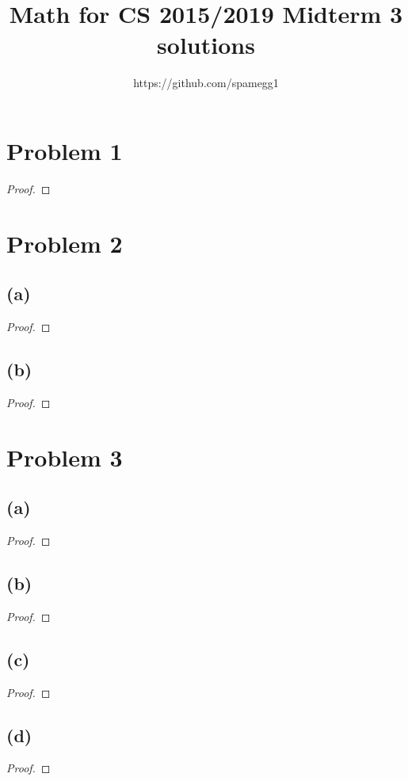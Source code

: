 \documentclass[14pt]{extarticle}
\title{Math for CS 2015/2019 Midterm 3 solutions}
\author{https://github.com/spamegg1}
\begin{document}
\maketitle
\tableofcontents

\section{Problem 1}

\begin{proof}

\end{proof}

\section{Problem 2}
\subsection{(a)}

\begin{proof}
\end{proof}

\subsection{(b)}
\begin{proof}
\end{proof}

\section{Problem 3}

\subsection{(a)}
\begin{proof}
\end{proof}

\subsection{(b)}
\begin{proof}
\end{proof}

\subsection{(c)}
\begin{proof}
\end{proof}

\subsection{(d)}
\begin{proof}
\end{proof}
\end{document}
